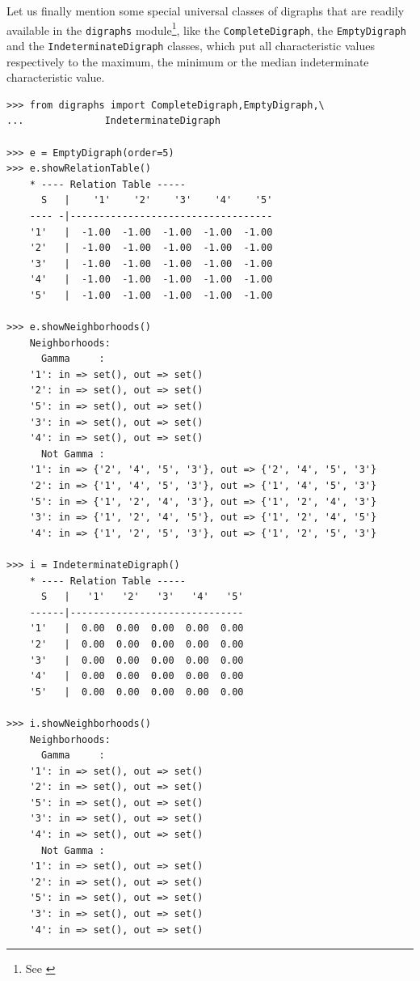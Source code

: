 Let us finally mention some special universal classes of digraphs that are readily available in the \texttt{digraphs} module\footnote{See \citealp{BIS-2021}}, like the \texttt{CompleteDigraph}, the \texttt{EmptyDigraph} and the \texttt{IndeterminateDigraph} classes, which put all characteristic values respectively to the maximum, the minimum or the median indeterminate characteristic value.
\begin{lstlisting}[caption={Complete, empty and indeterminate digraphs},label=list:2.11]
>>> from digraphs import CompleteDigraph,EmptyDigraph,\
...   			 IndeterminateDigraph
   
>>> e = EmptyDigraph(order=5)
>>> e.showRelationTable()
    * ---- Relation Table -----
      S   |    '1'    '2'    '3'    '4'	   '5'	  
    ---- -|-----------------------------------
    '1'   |  -1.00  -1.00  -1.00  -1.00	 -1.00	 
    '2'   |  -1.00  -1.00  -1.00  -1.00	 -1.00	 
    '3'   |  -1.00  -1.00  -1.00  -1.00	 -1.00	 
    '4'   |  -1.00  -1.00  -1.00  -1.00	 -1.00	 
    '5'   |  -1.00  -1.00  -1.00  -1.00	 -1.00

>>> e.showNeighborhoods() 
    Neighborhoods:
      Gamma     :
    '1': in => set(), out => set()
    '2': in => set(), out => set()
    '5': in => set(), out => set()
    '3': in => set(), out => set()
    '4': in => set(), out => set()
      Not Gamma :
    '1': in => {'2', '4', '5', '3'}, out => {'2', '4', '5', '3'}
    '2': in => {'1', '4', '5', '3'}, out => {'1', '4', '5', '3'}
    '5': in => {'1', '2', '4', '3'}, out => {'1', '2', '4', '3'}
    '3': in => {'1', '2', '4', '5'}, out => {'1', '2', '4', '5'}
    '4': in => {'1', '2', '5', '3'}, out => {'1', '2', '5', '3'}

>>> i = IndeterminateDigraph()
    * ---- Relation Table -----
      S   |   '1'   '2'	  '3'	'4'   '5'	  
    ------|------------------------------
    '1'   |  0.00  0.00	 0.00  0.00  0.00	 
    '2'   |  0.00  0.00	 0.00  0.00  0.00	 
    '3'   |  0.00  0.00	 0.00  0.00  0.00	 
    '4'   |  0.00  0.00	 0.00  0.00  0.00	 
    '5'   |  0.00  0.00	 0.00  0.00  0.00	 

>>> i.showNeighborhoods()
    Neighborhoods:
      Gamma     :
    '1': in => set(), out => set()
    '2': in => set(), out => set()
    '5': in => set(), out => set()
    '3': in => set(), out => set()
    '4': in => set(), out => set()
      Not Gamma :
    '1': in => set(), out => set()
    '2': in => set(), out => set()
    '5': in => set(), out => set()
    '3': in => set(), out => set()
    '4': in => set(), out => set()
\end{lstlisting}

